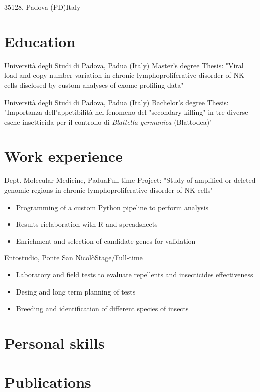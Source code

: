 \documentclass{fancy_cv}
\author{Edoardo Giussani}
\begin{document}

    \address{Via Dorighello, 1}{35128, Padova (PD)}{Italy}


    \section{Education}
        {Università degli Studi di Padova, Padua (Italy)} {Master's degree}
        Thesis: "Viral load and copy number variation in chronic 
          lymphoproliferative disorder of NK cells disclosed by custom analyses
          of exome profiling data"

        {Università degli Studi di Padova, Padua (Italy)} {Bachelor's degree}
        Thesis: "Importanza dell'appetibilità nel fenomeno del "secondary 
        killing" in tre diverse esche insetticida per il controllo
        di \textit{Blattella germanica} (Blattodea)"


    \section{Work experience}
    {Dept. Molecular Medicine, Padua}{Full-time}
        Project: "Study of amplified or deleted genomic regions in chronic 
        lymphoproliferative disorder of NK cells"
    \begin{itemize}
        \item Programming of a custom Python pipeline to perform analysis
        \item Results rielaboration with R and spreadsheets
        \item Enrichment and selection of candidate genes for validation 
    \end{itemize}

    {Entostudio, Ponte San Nicolò}{Stage/Full-time}
    \begin{itemize}
        \item Laboratory and field tests to evaluate repellents and insecticides effectiveness 
        \item Desing and long term planning of tests
        \item Breeding and identification of different species of insects
    \end{itemize}

    \section{Personal skills}


    \section{Publications}
            \nocite{*}
            \printbibliography[heading=none,filter=mine]{}
\end{document}
